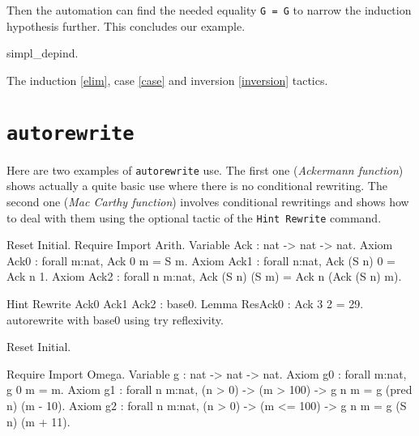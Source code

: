 Then the automation can find the needed equality {\tt G = G} to narrow
the induction hypothesis further. This concludes our example.

\begin{coq_example}
  simpl_depind.
\end{coq_example}

\SeeAlso The induction \ref{elim}, case \ref{case} and inversion \ref{inversion} tactics.

\section[\tt autorewrite]{\tt autorewrite\label{autorewrite-example}}

Here are two examples of {\tt autorewrite} use. The first one ({\em Ackermann
function}) shows actually a quite basic use where there is no conditional
rewriting. The second one ({\em Mac Carthy function}) involves conditional
rewritings and shows how to deal with them using the optional tactic of the
{\tt Hint~Rewrite} command.

\firstexample
{}

\begin{coq_example*}
Reset Initial.
Require Import Arith.
Variable Ack : 
           nat -> nat -> nat.
Axiom Ack0 : 
        forall m:nat, Ack 0 m = S m.
Axiom Ack1 : forall n:nat, Ack (S n) 0 = Ack n 1.
Axiom Ack2 : forall n m:nat, Ack (S n) (S m) = Ack n (Ack (S n) m).
\end{coq_example*}

\begin{coq_example}
Hint Rewrite Ack0 Ack1 Ack2 : base0.
Lemma ResAck0 : 
 Ack 3 2 = 29.
autorewrite with base0 using try reflexivity.
\end{coq_example}

\begin{coq_eval}
Reset Initial.
\end{coq_eval}


\begin{coq_example*}
Require Import Omega.
Variable g :   
           nat -> nat -> nat.
Axiom g0 : 
        forall m:nat, g 0 m = m.
Axiom
  g1 :
    forall n m:nat,
      (n > 0) -> (m > 100) -> g n m = g (pred n) (m - 10).
Axiom
  g2 :
    forall n m:nat,
      (n > 0) -> (m <= 100) -> g n m = g (S n) (m + 11).
\end{coq_example*}

